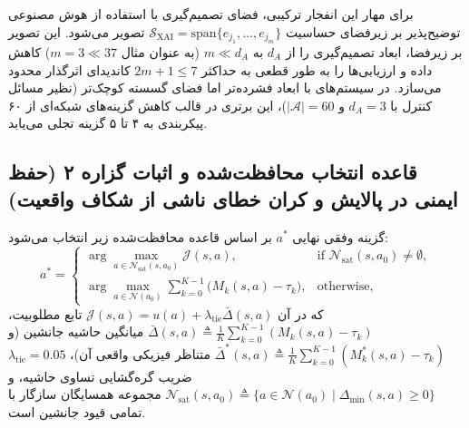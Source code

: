 \documentclass[oneside,openany,phd]{TMU-Thesis}
\begin{document}
برای مهار این انفجار ترکیبی، فضای تصمیم‌گیری با استفاده از هوش مصنوعی توضیح‌پذیر  بر زیرفضای حساسیت $\mathcal{S}_{\text{XAI}} = \text{span}\{e_{j_1}, \dots, e_{j_m}\}$ تصویر می‌شود. این تصویر بر زیرفضا، ابعاد تصمیم‌گیری را از $d_A$ به $m \ll d_A$ (به عنوان مثال $m = 3 \ll 37$) کاهش داده و ارزیابی‌ها را به طور قطعی به حداکثر $2m + 1 \le 7$ کاندیدای اثرگذار محدود می‌سازد. در سیستم‌های با ابعاد فشرده‌تر اما فضای گسسته کوچک‌تر (نظیر مسائل کنترل با $d_A = 3$ و $|\mathcal{A}| = 60$)، این برتری در قالب کاهش گزینه‌های شبکه‌ای از ۶۰ پیکربندی به ۴ تا ۵ گزینه تجلی می‌یابد.

\subsection{قاعده انتخاب محافظت‌شده و اثبات گزاره ۲ (حفظ ایمنی در پالایش و کران خطای ناشی از شکاف واقعیت)}

گزینه وفقی نهایی $a^*$ بر اساس قاعده محافظت‌شده زیر انتخاب می‌شود:
\begin{equation}
\label{eq:alr_selection}
a^* = \begin{cases}
\displaystyle\arg\max_{a \in \mathcal{N}_{\text{sat}}(s, a_0)} \mathcal{J}(s, a), & \text{if } \mathcal{N}_{\text{sat}}(s, a_0) \neq \emptyset, \\[8pt]
\displaystyle\arg\max_{a \in \mathcal{N}(a_0)} \sum_{k=0}^{K-1} \big( M_k(s, a) - \tau_k \big), & \text{otherwise},
\end{cases}
\end{equation}
که در آن $\mathcal{J}(s, a) = u(a) + \lambda_{\text{tie}}\bar{\Delta}(s, a)$ تابع مطلوبیت، $\bar{\Delta}(s, a) \triangleq \frac{1}{K}\sum_{k=0}^{K-1}(M_k(s, a) - \tau_k)$ میانگین حاشیه جانشین (و $\bar{\Delta}^*(s, a) \triangleq \frac{1}{K}\sum_{k=0}^{K-1}(M_k^*(s, a) - \tau_k)$ متناظر فیزیکی واقعی آن)، $\lambda_{\text{tie}} = 0.05$ ضریب گره‌گشایی تساوی حاشیه، و $\mathcal{N}_{\text{sat}}(s, a_0) \triangleq \{a \in \mathcal{N}(a_0) \mid \Delta_{\min}(s, a) \ge 0\}$ مجموعه همسایگان سازگار با تمامی قیود جانشین است.
\end{document}
